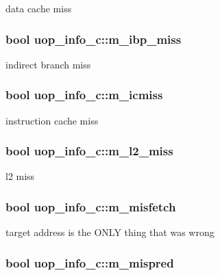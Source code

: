 \label{classuop__info__c_ad554638974bb5d439d74557a13d3aa71}
data cache miss \hypertarget{classuop__info__c_aeaf923369a4504419d5f27cc346fa36e}{
\subsubsection[{m\_\-ibp\_\-miss}]{\setlength{\rightskip}{0pt plus 5cm}bool {\bf uop\_\-info\_\-c::m\_\-ibp\_\-miss}}}
\label{classuop__info__c_aeaf923369a4504419d5f27cc346fa36e}
indirect branch miss \hypertarget{classuop__info__c_ad6c8da616dd80c531b797c1f2880268c}{
\subsubsection[{m\_\-icmiss}]{\setlength{\rightskip}{0pt plus 5cm}bool {\bf uop\_\-info\_\-c::m\_\-icmiss}}}
\label{classuop__info__c_ad6c8da616dd80c531b797c1f2880268c}
instruction cache miss \hypertarget{classuop__info__c_ac226c2e89b9c9451b5c634e7ca444434}{
\subsubsection[{m\_\-l2\_\-miss}]{\setlength{\rightskip}{0pt plus 5cm}bool {\bf uop\_\-info\_\-c::m\_\-l2\_\-miss}}}
\label{classuop__info__c_ac226c2e89b9c9451b5c634e7ca444434}
l2 miss \hypertarget{classuop__info__c_a8f11ffb370bdf4a86d78f75ed1c5d65c}{
\subsubsection[{m\_\-misfetch}]{\setlength{\rightskip}{0pt plus 5cm}bool {\bf uop\_\-info\_\-c::m\_\-misfetch}}}
\label{classuop__info__c_a8f11ffb370bdf4a86d78f75ed1c5d65c}
target address is the ONLY thing that was wrong \hypertarget{classuop__info__c_aa8c135a846af6e973cab44b6527ae96a}{
\subsubsection[{m\_\-mispred}]{\setlength{\rightskip}{0pt plus 5cm}bool {\bf uop\_\-info\_\-c::m\_\-mispred}}}
